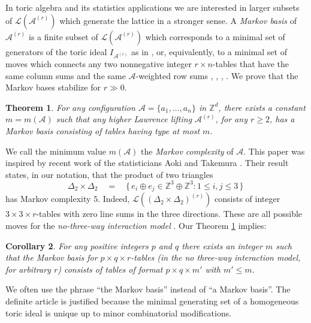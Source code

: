 \documentclass[11pt]{amsart}
\newtheorem{theorem}{Theorem}
\newtheorem{corollary}[theorem]{Corollary}
\theoremstyle{definition}
\newcommand{\integers}{{\mathbb Z}}
\renewcommand{\L}{{\mathcal L}}
\newcommand{\A}{{\mathcal A}}
\begin{document}
  In toric algebra and its statistics applications we are
interested in larger subsets of   $\L(\A^{(r)})$ which generate
the lattice in a stronger sense. A \emph{Markov basis} of $\A^{(r)}$
is a finite subset of $\L(\A^{(r)})$ which corresponds to a minimal
set of generators of the toric  ideal $I_{\A^{(r)}}$
as in \cite[\S 4]{Sturmfels-book}, or, equivalently,
to a minimal set of moves which connects any
two nonnegative integer $r\times n$-tables that have the same
column sums and the  same $\A$-weighted row sums  \cite{AS1},
\cite{Diaconis}, \cite{GMS}, \cite{HS}.
We prove that the Markov bases stabilize for $r \gg 0$.

  \begin{theorem}
  \label{first}
For any configuration $\A=\{a_1,\dots,a_n\}$ in $\integers^d$,
there exists a constant $m=m(\A)$ such that any
higher Lawrence lifting $\A^{(r)}$, for any $r \geq 2$, 
has a Markov basis
consisting of tables having type at most $m$.
  \end{theorem}

  We call the minimum value $m(\A)$ the \emph{Markov complexity} of $\A$.
This paper was inspired by recent work of
the statisticians Aoki and Takemura  \cite{AS1}. Their result
states, in our notation, that  the product of two triangles
  \[
  \Delta_2\times \Delta_2
\quad  = \quad
  \{\,e_i\oplus e_j\in \integers^3\oplus \integers^3 : 1\le i,j\le 3  
\,\}\,
  \]
has Markov complexity $5$.
Indeed, $\L((\Delta_2\times \Delta_2)^{(r)})$  consists of
integer $3\times 3\times r$-tables with zero line sums in the three  
directions.
These are all possible moves for the {\em no-three-way interaction  
model} \cite{Diaconis}. Our Theorem \ref{first} implies:

  \begin{corollary}
  \label{coro:threeway}
  For any positive integers $p$ and $q$
there exists an integer $m$ such that the
Markov basis for $p\times q\times r$-tables (in the no three-way  
interaction
model, for arbitrary $r$) consists of tables of format $p\times q\times  
m'$ with $m'\le m$. \end{corollary}

We often use the phrase ``the Markov basis''
instead of ``a Markov basis''. The definite
article  is
justified because the  minimal generating set 
of a homogeneous toric ideal is unique up
to minor combinatorial modifications.
\end{document}
